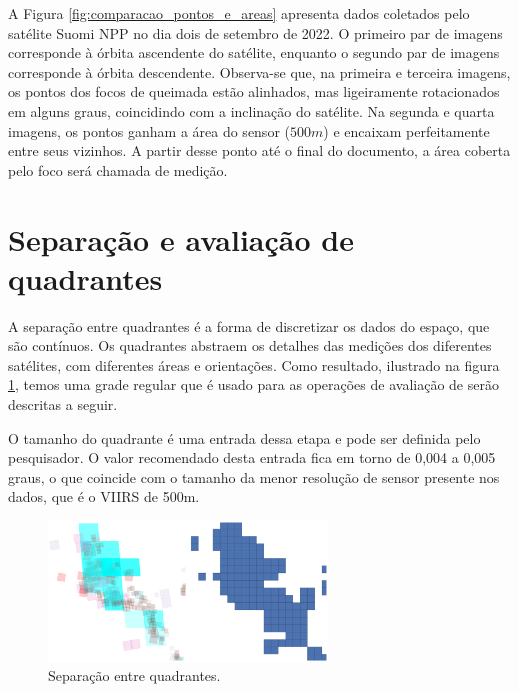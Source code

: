 \documentclass[cic,tc]{iiufrgs}
\begin{document}
A Figura \ref{fig:comparacao_pontos_e_areas} apresenta dados coletados pelo satélite  Suomi NPP no dia dois de setembro de 2022. O primeiro par de imagens corresponde à órbita ascendente do satélite, enquanto o segundo par de imagens corresponde à órbita descendente. Observa-se que, na primeira e terceira imagens, os pontos dos focos de queimada estão alinhados, mas ligeiramente rotacionados em alguns graus, coincidindo com a inclinação do satélite. Na segunda e quarta imagens, os pontos ganham a área do sensor ($500m$) e encaixam perfeitamente entre seus vizinhos. A partir desse ponto até o final do documento, a área coberta pelo foco será chamada de medição. \par

\section{Separação e avaliação de quadrantes}

A separação entre quadrantes é a forma de discretizar os dados do espaço, que são contínuos. Os quadrantes abstraem os detalhes das medições dos diferentes satélites, com diferentes áreas e orientações. Como resultado, ilustrado na figura \ref{fig:satellite_quads_split}, temos uma grade regular que é usado para as operações de avaliação de serão descritas a seguir. \par

O tamanho do quadrante é uma entrada dessa etapa e pode ser definida pelo pesquisador. O valor recomendado desta entrada fica em torno de 0,004 a 0,005 graus, o que coincide com o tamanho da menor resolução de sensor presente nos dados, que é o VIIRS de 500m. \par

\begin{figure}[H]
    \caption{Separação entre quadrantes.}
    \begin{center}
        \includegraphics[width=20em]{satellite_quads_split}
    \end{center}
    \label{fig:satellite_quads_split}
\end{figure}
\end{document}
